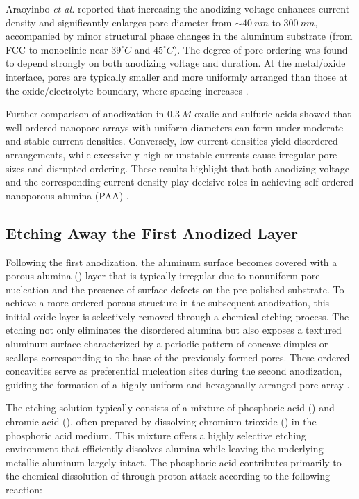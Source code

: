 \documentclass{rapportCS}
\begin{document}
	Araoyinbo \textit{et al.} reported that increasing the anodizing voltage enhances current density and significantly enlarges pore diameter from $\sim 40~nm$ to $300~nm$, accompanied by minor structural phase changes in the aluminum substrate (from FCC to monoclinic near $39^{\circ}C$ and $45^{\circ}C$). The degree of pore ordering was found to depend strongly on both anodizing voltage and duration. At the metal/oxide interface, pores are typically smaller and more uniformly arranged than those at the oxide/electrolyte boundary, where spacing increases \cite{eessaa2023review}.  
	
	Further comparison of anodization in $0.3~M$ oxalic and sulfuric acids showed that well-ordered nanopore arrays with uniform diameters can form under moderate and stable current densities. Conversely, low current densities yield disordered arrangements, while excessively high or unstable currents cause irregular pore sizes and disrupted ordering. These results highlight that both anodizing voltage and the corresponding current density play decisive roles in achieving self-ordered nanoporous alumina (PAA) \cite{eessaa2023review}.
	
	\subsection{Etching Away the First Anodized Layer}
	
	Following the first anodization, the aluminum surface becomes covered with a porous alumina () layer that is typically irregular due to nonuniform pore nucleation and the presence of surface defects on the pre-polished substrate. To achieve a more ordered porous structure in the subsequent anodization, this initial oxide layer is selectively removed through a chemical etching process. The etching not only eliminates the disordered alumina but also exposes a textured aluminum surface characterized by a periodic pattern of concave dimples or scallops corresponding to the base of the previously formed pores. These ordered concavities serve as preferential nucleation sites during the second anodization, guiding the formation of a highly uniform and hexagonally arranged pore array \cite{gu20163d}.
	
	The etching solution typically consists of a mixture of phosphoric acid () and chromic acid (), often prepared by dissolving chromium trioxide () in the phosphoric acid medium. This mixture offers a highly selective etching environment that efficiently dissolves alumina while leaving the underlying metallic aluminum largely intact. The phosphoric acid contributes primarily to the chemical dissolution of  through proton attack according to the following reaction:
	
\end{document}
